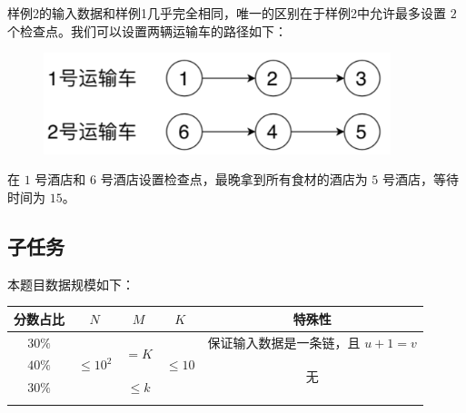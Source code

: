 样例2的输入数据和样例1几乎完全相同，唯一的区别在于样例2中允许最多设置 $2$ 个检查点。我们可以设置两辆运输车的路径如下：

\begin{figure}[H]
    \centering
    \includegraphics[width=0.9\textwidth]{image/21/4-p-3.png}
\end{figure}

在 $1$ 号酒店和 $6$ 号酒店设置检查点，最晚拿到所有食材的酒店为 $5$ 号酒店，等待时间为 $15$。

\subsection*{子任务}

本题目数据规模如下：

\begin{table}[H]
    \centering
    \begin{tabular}{c|c|c|c|c}
        \thickhline
        分数占比 & $N$                         & $M$                   & $K$                       & 特殊性                           \\ \hline
        $30\%$   & \multirow{3}{*}{$\le 10^2$} & \multirow{2}{*}{$=K$} & \multirow{3}{*}{$\le 10$} & 保证输入数据是一条链，且 $u+1=v$ \\ \cline{1-1} \cline{5-5}
        $40\%$   &                             &                       &                           & \multirow{2}{*}{无}              \\ \cline{1-1} \cline{3-3}
        $30\%$   &                             & $\le k$               &                           &                                  \\ \thickhline
    \end{tabular}
\end{table}